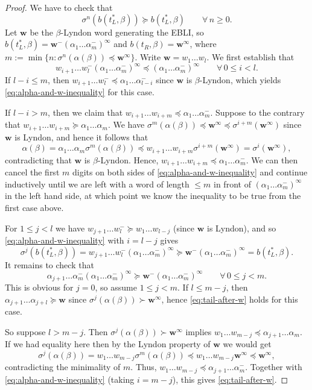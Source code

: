 \documentclass[11pt]{amsart}
\theoremstyle{definition}
\theoremstyle{remark}
\numberwithin{equation}{section}
\newcommand{\w}{\mathbf{w}}
\newcommand{\f}{\infty}
\newcommand{\al}{\alpha}
\newcommand{\lle}{\preccurlyeq}
\newcommand{\lge}{\succcurlyeq}
\newcommand{\si}{\sigma}
\begin{document}
\begin{proof}
We have to check that
\begin{equation} \label{eq:b-shifts-bigger}
\si^n(b(t_L^*,\beta))\lge b(t_L^*,\beta) \qquad \forall\,n\geq 0.
\end{equation}
Let $\w$ be the $\beta$-Lyndon word generating the EBLI, so $b(t_L^*,\beta)=\w^-(\al_1\dots\al_m^-)^\f$ and $b(t_R,\beta)=\w^\f$, where $m:=\min\{n:\si^n(\al(\beta))\lle \w^\f\}$.
Write $\w=w_1\dots w_l$. We first establish that
\begin{equation} \label{eq:alpha-and-w-inequality}
w_{i+1}\dots w_l^-(\al_1\dots\al_m^-)^\f \lle (\al_1\dots\al_m^-)^\f \qquad \forall\,0\leq i<l.
\end{equation}
If $l-i\leq m$, then $w_{i+1}\dots w_l^-\lle \al_1\dots \al_{l-i}^-$ since $\w$ is $\beta$-Lyndon, which yields \eqref{eq:alpha-and-w-inequality} for this case.

If $l-i>m$, then we claim that $w_{i+1}\dots w_{i+m}\lle \al_1\dots\al_m^-$. Suppose to the contrary that $w_{i+1}\dots w_{i+m}\lge \al_1\dots\al_m$. We have $\si^m(\al(\beta))\lle \w^\f\lle \si^{i+m}(\w^\f)$ since $\w$ is Lyndon, and hence it follows that
\[
\al(\beta)=\al_1\dots\al_m\si^m(\al(\beta))\lle w_{i+1}\dots w_{i+m}\si^{i+m}(\w^\f)=\si^i(\w^\f),
\]
contradicting that $\w$ is $\beta$-Lyndon. Hence, $w_{i+1}\dots w_{i+m}\lle \al_1\dots\al_m^-$. We can then cancel the first $m$ digits on both sides of \eqref{eq:alpha-and-w-inequality} and continue inductively until we are left with a word of length $\leq m$ in front of $(\al_1\dots\al_m^-)^\f$ in the left hand side, at which point we know the inequality to be true from the first case above.

For $1\leq j<l$ we have $w_{j+1}\dots w_l^-\lge w_1\dots w_{l-j}$ (since $\w$ is Lyndon), and so \eqref{eq:alpha-and-w-inequality} with $i=l-j$ gives
\[
\si^j(b(t_L^*,\beta))=w_{j+1}\dots w_l^-(\al_1\dots\al_m^-)^\f\lge \w^-(\al_1\dots\al_m^-)^\f=b(t_L^*,\beta).
\]
It remains to check that
\begin{equation} \label{eq:tail-after-w}
\al_{j+1}\dots\al_m^-(\al_1\dots\al_m^-)^\f\lge \w^-(\al_1\dots\al_m^-)^\f \qquad \forall\, 0\leq j<m.
\end{equation}
This is obvious for $j=0$, so assume $1\leq j<m$. If $l\leq m-j$, then $\al_{j+1}\dots\al_{j+l}\lge\w$ since $\si^j(\al(\beta))\succ\w^\f$, hence \eqref{eq:tail-after-w} holds for this case.

So suppose $l>m-j$. Then $\si^j(\al(\beta))\succ\w^\f$ implies $w_1\dots w_{m-j}\lle \al_{j+1}\dots\al_m$. If we had equality here then by the Lyndon property of $\w$ we would get
\[
\si^j(\al(\beta))=w_1\dots w_{m-j}\si^m(\al(\beta))\lle w_1\dots w_{m-j}\w^\f\lle \w^\f,
\]
contradicting the minimality of $m$. Thus, $w_1\dots w_{m-j}\lle \al_{j+1}\dots\al_m^-$. Together with \eqref{eq:alpha-and-w-inequality} (taking $i=m-j$), this gives \eqref{eq:tail-after-w}.
\end{proof}
\end{document}
